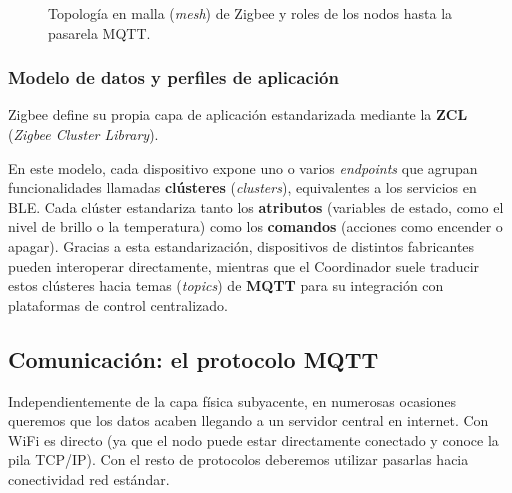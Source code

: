 \documentclass[../main.tex]{subfiles}
\begin{document}
\begin{figure}[h]
                    \caption{Topología en malla (\emph{mesh}) de Zigbee y roles de los nodos hasta la pasarela MQTT.}
                    \label{fig:zigbee_mesh}
                \end{figure}

            \subsubsection{Modelo de datos y perfiles de aplicación}
                Zigbee define su propia capa de aplicación estandarizada mediante la \textbf{ZCL} (\emph{Zigbee Cluster Library}).

                En este modelo, cada dispositivo expone uno o varios \emph{endpoints} que agrupan funcionalidades llamadas \textbf{clústeres} (\emph{clusters}), equivalentes a los servicios en BLE. Cada clúster estandariza tanto los \textbf{atributos} (variables de estado, como el nivel de brillo o la temperatura) como los \textbf{comandos} (acciones como encender o apagar). Gracias a esta estandarización, dispositivos de distintos fabricantes pueden interoperar directamente, mientras que el Coordinador suele traducir estos clústeres hacia temas (\emph{topics}) de \textbf{MQTT} para su integración con plataformas de control centralizado.


        \subsection{Comunicación: el protocolo MQTT}
            Independientemente de la capa física subyacente, en numerosas ocasiones queremos que los datos acaben llegando a un servidor central en internet. Con WiFi es directo (ya que el nodo puede estar directamente conectado y conoce la pila TCP/IP). Con el resto de protocolos deberemos utilizar pasarlas hacia conectividad red estándar.
\end{document}
